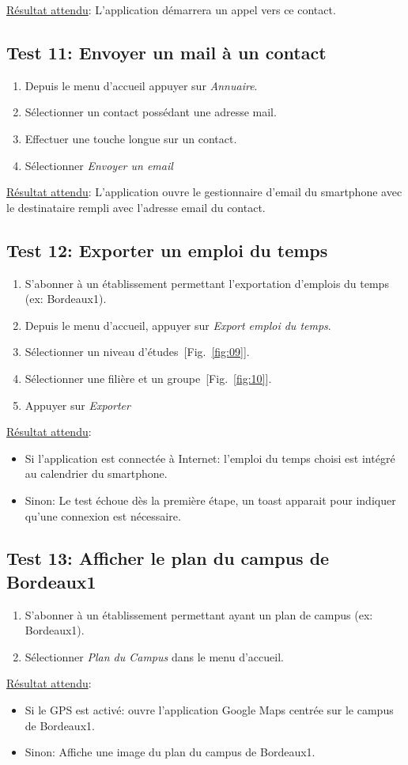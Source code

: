     \underline{Résultat attendu}: L'application démarrera un appel vers ce contact.

  \subsection{Test 11: Envoyer un mail à un contact}
    \begin{enumerate}
    \item Depuis le menu d'accueil appuyer sur \emph{Annuaire}.
    \item Sélectionner un contact possédant une adresse mail.
    \item Effectuer une touche longue sur un contact.
    \item Sélectionner \emph{Envoyer un email}
    \end{enumerate}

    \underline{Résultat attendu}: L'application ouvre le gestionnaire d'email du smartphone avec le destinataire rempli avec l'adresse email du contact.

  \subsection{Test 12: Exporter un emploi du temps}
    \begin{enumerate}
    \item S'abonner à un établissement permettant l'exportation d'emplois du temps (ex: Bordeaux1).
    \item Depuis le menu d'accueil, appuyer sur \emph{Export emploi du temps}.
    \item Sélectionner un niveau d'études~[Fig.~\ref{fig:09}].
    \item Sélectionner une filière et un groupe~[Fig.~\ref{fig:10}].
    \item Appuyer sur \emph{Exporter}
    \end{enumerate}

    \underline{Résultat attendu}:
    \begin{itemize}
    \item Si l'application est connectée à Internet: l'emploi du temps choisi est intégré au calendrier du smartphone.
    \item Sinon: Le test échoue dès la première étape, un toast apparait pour indiquer qu'une connexion est nécessaire.
    \end{itemize}

  \subsection{Test 13: Afficher le plan du campus de Bordeaux1}
    \begin{enumerate}
    \item S'abonner à un établissement permettant ayant un plan de campus (ex: Bordeaux1).
    \item Sélectionner \emph{Plan du Campus} dans le menu d'accueil.
    \end{enumerate}

    \underline{Résultat attendu}:
    \begin{itemize}
    \item Si le GPS est activé: ouvre l'application Google Maps centrée sur le campus de Bordeaux1.
    \item Sinon: Affiche une image du plan du campus de Bordeaux1.
    \end{itemize}
